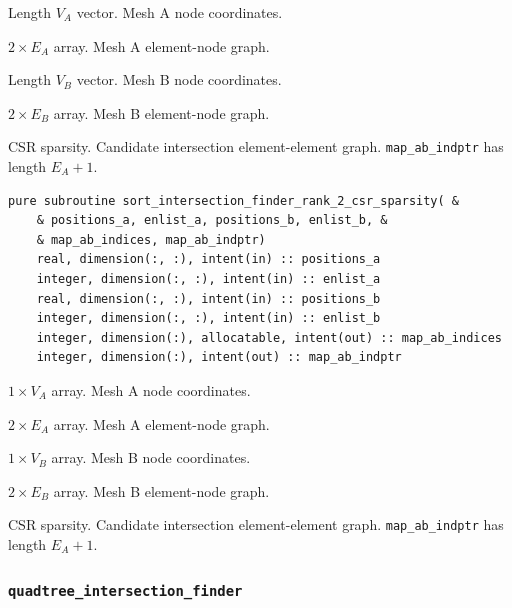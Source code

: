 \documentclass{article}
\begin{document}
\begin{description}[font=\ttfamily\bfseries,leftmargin=2.2\parindent,labelindent=1.7\parindent,noitemsep]
  \item[positions\_a] Length $V_A$ vector. Mesh A node coordinates.
  \item[enlist\_a] $2 \times E_A$ array. Mesh A element-node graph.
  \item[positions\_b] Length $V_B$ vector. Mesh B node coordinates.
  \item[enlist\_b] $2 \times E_B$ array. Mesh B element-node graph.
  \item[map\_ab\_indices, map\_ab\_indptr] CSR sparsity. Candidate intersection
    element-element graph. \linebreak \verb+map_ab_indptr+ has length $E_A + 1$.
\end{description}

\begin{lstlisting}[language=FORTRAN]
  pure subroutine sort_intersection_finder_rank_2_csr_sparsity( &
    & positions_a, enlist_a, positions_b, enlist_b, &
    & map_ab_indices, map_ab_indptr)
    real, dimension(:, :), intent(in) :: positions_a
    integer, dimension(:, :), intent(in) :: enlist_a
    real, dimension(:, :), intent(in) :: positions_b
    integer, dimension(:, :), intent(in) :: enlist_b
    integer, dimension(:), allocatable, intent(out) :: map_ab_indices
    integer, dimension(:), intent(out) :: map_ab_indptr
\end{lstlisting}

\begin{description}[font=\ttfamily\bfseries,leftmargin=2.2\parindent,labelindent=1.7\parindent,noitemsep]
  \item[positions\_a] $1 \times V_A$ array. Mesh A node coordinates.
  \item[enlist\_a] $2 \times E_A$ array. Mesh A element-node graph.
  \item[positions\_b] $1 \times V_B$ array. Mesh B node coordinates.
  \item[enlist\_b] $2 \times E_B$ array. Mesh B element-node graph.
  \item[map\_ab\_indices, map\_ab\_indptr] CSR sparsity. Candidate intersection
    element-element graph. \linebreak \verb+map_ab_indptr+ has length $E_A + 1$.
\end{description}

\subsubsection{\texttt{quadtree\_intersection\_finder}}\label{sect:quadtree_global}
\end{document}
